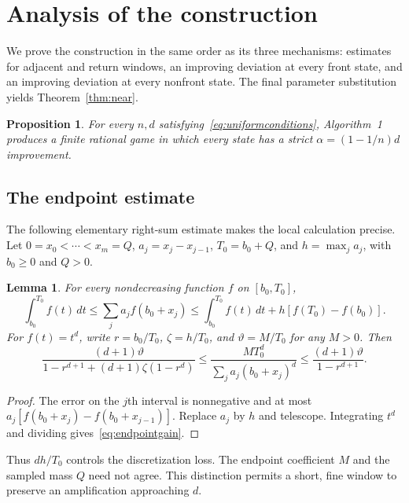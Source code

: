 \documentclass[11pt]{article}
\newtheorem{lemma}[theorem]{Lemma}
\newtheorem{proposition}[theorem]{Proposition}
\theoremstyle{definition}
\begin{document}
\section{Analysis of the construction}\label{sec:analysis}\label{app:construction}
We prove the construction in the same order as its three mechanisms: estimates for adjacent and return windows, an improving deviation at every front state, and an improving deviation at every nonfront state. The final parameter substitution yields Theorem~\ref{thm:near}.

\begin{proposition}\label{thm:uniformfamily}
For every $n,d$ satisfying~\eqref{eq:uniformconditions}, Algorithm~1 produces a finite rational game in which every state has a strict $\alpha=(1-1/n)d$ improvement.
\end{proposition}

\subsection{The endpoint estimate}
The following elementary right-sum estimate makes the local calculation precise. Let $0=x_0<\cdots<x_m=Q$, $a_j=x_j-x_{j-1}$, $T_0=b_0+Q$, and $h=\max_ja_j$, with $b_0\ge0$ and $Q>0$.
\begin{lemma}\label{lem:area}
For every nondecreasing function $f$ on $[b_0,T_0]$,
\begin{equation}\label{eq:areaerror}
 \int_{b_0}^{T_0}f(t)\,dt\le\sum_ja_jf(b_0+x_j)
 \le\int_{b_0}^{T_0}f(t)\,dt+h[f(T_0)-f(b_0)].
\end{equation}
For $f(t)=t^d$, write $r=b_0/T_0$, $\zeta=h/T_0$, and $\vartheta=M/T_0$ for any $M>0$. Then
\begin{equation}\label{eq:endpointgain}
 \frac{(d+1)\vartheta}{1-r^{d+1}+(d+1)\zeta(1-r^d)}
 \le\frac{MT_0^d}{\sum_ja_j(b_0+x_j)^d}
 \le\frac{(d+1)\vartheta}{1-r^{d+1}}.
\end{equation}
\end{lemma}
\begin{proof}
The error on the $j$th interval is nonnegative and at most
$a_j[f(b_0+x_j)-f(b_0+x_{j-1})]$. Replace $a_j$ by $h$ and telescope. Integrating $t^d$ and dividing gives~\eqref{eq:endpointgain}.
\end{proof}
Thus $dh/T_0$ controls the discretization loss. The endpoint coefficient $M$ and the sampled mass $Q$ need not agree. This distinction permits a short, fine window to preserve an amplification approaching $d$.
\end{document}
